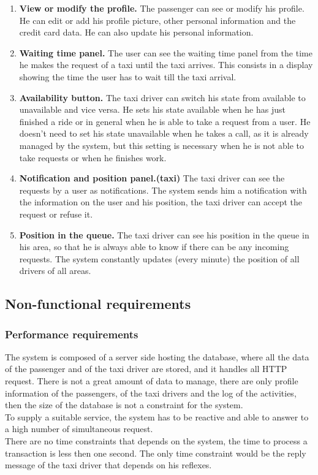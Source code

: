 \documentclass[18pt,oneside,a4paper, titlepage]{article}
\begin{document}
\begin{enumerate}
			\item \textbf{View or modify the profile.}
				The passenger can see or modify his profile. He can edit or add his profile picture, other personal information and the credit card data. He can also update his personal information.
			\item \textbf{Waiting time panel.}
				The user can see the waiting time panel from the time he makes the request of a taxi until the taxi arrives. This consists in a display showing the time the user has to wait till the taxi arrival.
			\item \textbf{Availability button.}
				The taxi driver can switch his state from available to unavailable and vice versa. He sets his state available when he has just finished a ride or in general when he is able to take a request from a user. He doesn't need to set his state unavailable when he takes a call, as it is already managed by the system, but this setting is necessary when he is not able to take requests or when he finishes work.
			\item \textbf{Notification and position panel.(taxi)}
				The taxi driver can see the requests by a user as notifications. The system sends him a notification with the information on the user and his position, the taxi driver can accept the request or refuse it.
			\item \textbf{Position in the queue.}
				The taxi driver can see his position in the queue in his area, so that he is always able to know if there can be any incoming requests. The system constantly updates (every minute) the position of all drivers of all areas.
		\end{enumerate}
	\subsection{Non-functional requirements}
		\subsubsection{Performance requirements}
			The system is composed of a server side hosting the database, where all the data of the passenger and of the taxi driver are stored, and it handles all HTTP request. There is not a great amount of data to manage, there are only profile information of the passengers, of the taxi drivers and the log of the activities, then the size of the database is not a constraint for the system.\\ To supply a suitable service, the system has to be reactive and able to answer to a high number of simultaneous request.\\ There are no time constraints that depends on the system, the time to process a transaction is less then one second. The only time constraint would be the reply message of the taxi driver that depends on his reflexes.
\end{document}
